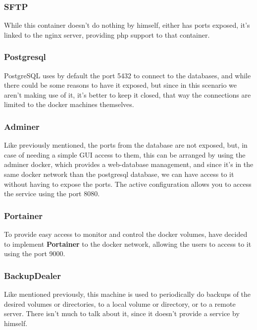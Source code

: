     \subsubsection[PHP]{SFTP}
    \begin{flushleft}
        While this container doesn't do nothing by himself, either has ports exposed, it's linked to the nginx server, providing php support
        to that container.
    \end{flushleft}

    \subsubsection[Postgresql]{Postgresql}
    \begin{flushleft}
        PostgreSQL uses by default the port 5432 to connect to the databases, and while there could be some reasons to
        have it exposed, but since in this scenario we aren't making use of it, it's better to keep it closed, that way
        the connections are limited to the docker machines themselves.
    \end{flushleft}
    \newpage
    \subsubsection[Adminer]{Adminer}
    \begin{flushleft}
        Like previously mentioned, the ports from the database are not exposed, but, in case of needing a simple GUI
        access to them, this can be arranged by using the adminer docker, which provides a web-database management,
        and since it's in the same docker network than the postgresql database, we can have access to it without having
        to expose the ports.
        The active configuration allows you to access the service using the port 8080.
    \end{flushleft}

    \subsubsection[Portainer]{Portainer}
    \begin{flushleft}
        To provide easy access to monitor and control the docker volumes, have decided to implement \textbf{Portainer}
        to the docker network, allowing the users to access to it using the port 9000.
    \end{flushleft}


    \subsubsection[Backup\_dealer]{BackupDealer}
    \begin{flushleft}
       Like mentioned previously, this machine is used to periodically do backups of the desired volumes or directories,
       to a local volume or directory, or to a remote server.
       There isn't much to talk about it, since it doesn't provide a service by himself.
    \end{flushleft}

